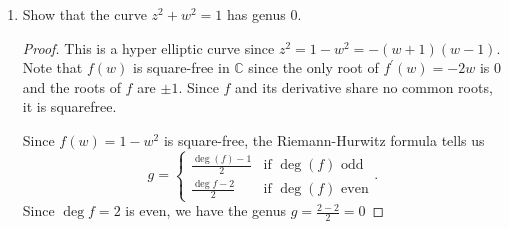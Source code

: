 \documentclass{article}
\renewcommand{\epsilon}{\varepsilon}
\begin{document}
\begin{enumerate}
\begin{proof}
		Since $f,g$ are holomorphic on $\partial D$, they are continuous, and since $\partial D$ is a closed subset of $\mathbb{C}$, it is compact.
		The modulus function is also continuous, and so by composition,		
		$|f|,|g|$ are both continuous real-valued functions and thus achieve a maximum and minimum on $\partial D$.
		
		Let $m = \min_{z \in \partial D} f$ and $M = \max_{z \in \partial D} g$. Pick $\epsilon < \frac{m}{M}$. Then on $\partial D$ 
		\begin{align*}
			| \epsilon g | &= \epsilon |g|\\
			& < \frac{m}{M} |g|\\
			& \leq \frac{m}{M}M\\
			&= m \leq |f|.
		\end{align*}
	\end{proof}

	\item Show that the curve $z^2 + w^2 = 1$ has genus $0$.
	
	\begin{proof}
		This is a hyper elliptic curve since $z^2 = 1-w^2 = - (w+1)(w-1)$. 
		Note that $f(w)$ is square-free in $\mathbb{C}$ since the only root of $f^\prime(w) = -2w$ is $0$ and the roots of $f$ are $\pm 1$. 
		Since $f$ and its derivative share no common roots, it is squarefree.
		
		Since $f(w) = 1-w^2$ is square-free, the Riemann-Hurwitz formula tells us
		\[g  = \begin{cases} \frac{\deg(f)-1}{2} & \text{if } \deg(f) \text{ odd} \\ \frac{\deg{f}-2}{2} & \text{if } \deg(f) \text{ even}  \end{cases}. \]
		Since $\deg f = 2$ is even, we have the genus $g = \frac{2-2}{2} = 0$
	\end{proof}
%	
	
\end{enumerate}
\end{document}
